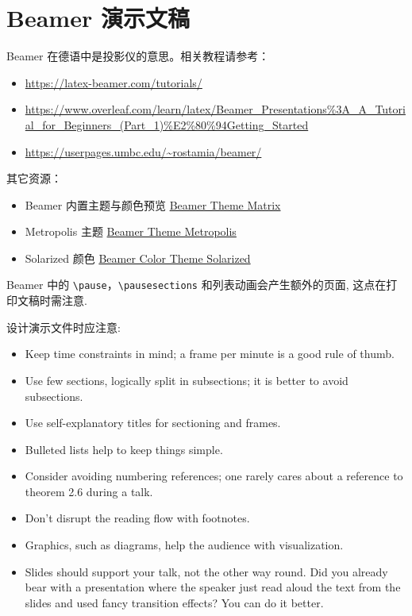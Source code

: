 \chapter{Beamer 演示文稿}

Beamer 在德语中是投影仪的意思。相关教程请参考：

\begin{itemize}
  \item \url{https://latex-beamer.com/tutorials/}
  \item \url{https://www.overleaf.com/learn/latex/Beamer_Presentations%3A_A_Tutorial_for_Beginners_(Part_1)%E2%80%94Getting_Started}
  \item \url{https://userpages.umbc.edu/~rostamia/beamer/}
\end{itemize}

其它资源：

\begin{itemize}
  \item Beamer 内置主题与颜色预览 \href{https://mpetroff.net/files/beamer-theme-matrix/}{Beamer Theme Matrix}
  \item Metropolis 主题 \href{https://github.com/matze/mtheme}{Beamer Theme Metropolis}
  \item Solarized 颜色 \href{https://github.com/jrnold/beamercolorthemesolarized}{Beamer Color Theme Solarized}
\end{itemize}

Beamer 中的 \verb|\pause|，\verb|\pausesections| 和列表动画会产生额外的页面, 这点在打印文稿时需注意.

设计演示文件时应注意:

\begin{itemize}
  \item Keep time constraints in mind; a frame per minute is a good rule of thumb.
  \item Use few sections, logically split in subsections; it is better to avoid subsections.
  \item Use self-explanatory titles for sectioning and frames.
  \item Bulleted lists help to keep things simple.
  \item Consider avoiding numbering references; one rarely cares about a
reference to theorem 2.6 during a talk.
  \item Don't disrupt the reading flow with footnotes.
  \item Graphics, such as diagrams, help the audience with visualization.   
  \item Slides should support your talk, not the other way round. Did you
already bear with a presentation where the speaker just read aloud the text from the slides and used fancy transition effects? You can do it better.
\end{itemize}


